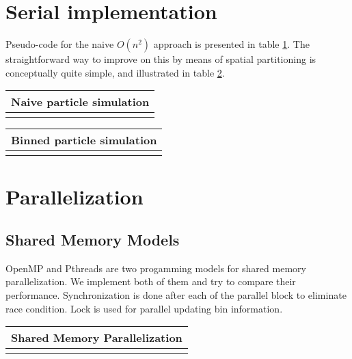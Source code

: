 \documentclass[11pt]{article}
\begin{document}
\section{Serial implementation}
Pseudo-code for the naive $O(n^2)$ approach is presented in table \ref{tab:naive}. The straightforward way to improve on this by means of spatial partitioning is conceptually quite simple, and illustrated in table \ref{tab:serial}.

\begin{table}[htb]
  \centering
  \begin{tabular}{l}
    \hline
      Naive particle simulation\\
    \hline
      \\
    \hline
  \end{tabular}
  \label{tab:naive}
\end{table}

\begin{table}[htb]
  \centering
  \begin{tabular}{l}
    \hline
      Binned particle simulation\\
    \hline
      \\
    \hline
  \end{tabular}
  \label{tab:serial}
\end{table}

\FloatBarrier

\section{Parallelization}
\subsection{Shared Memory Models}
OpenMP and Pthreads are two progamming models for shared memory parallelization. We implement both of them and try to 
compare their performance. Synchronization is done after each of the parallel block to eliminate race condition. Lock
is used for parallel updating bin information.

\begin{table}[htb]
  \centering
  \begin{tabular}{l}
    \hline
      Shared Memory Parallelization\\
    \hline
      \\
    \hline
  \end{tabular}
  \label{tab:shared_memory}
\end{table}
\end{document}
